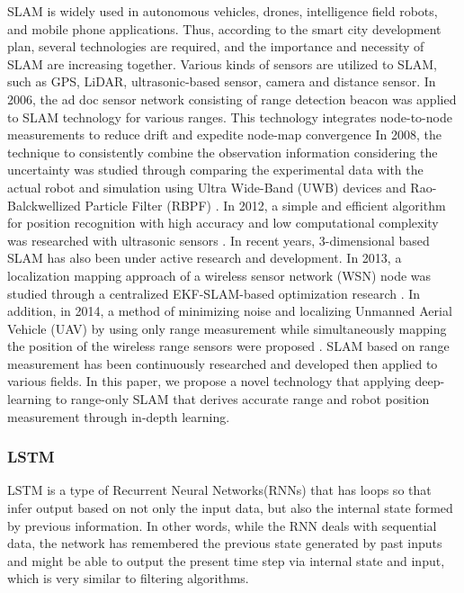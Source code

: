 \documentclass[letterpaper, 10 pt, conference]{ieeeconf}  %
\begin{document}
SLAM is widely used in autonomous vehicles, drones, intelligence field robots, and mobile phone applications. Thus, according to the smart city development plan, several technologies are required, and the importance and necessity of SLAM are increasing together. Various kinds of sensors are utilized to SLAM, such as GPS, LiDAR, ultrasonic-based sensor, camera and distance sensor.
In 2006, the ad doc sensor network consisting of range detection beacon was applied to SLAM technology for various ranges. This technology integrates node-to-node measurements to reduce drift and expedite node-map convergence \cite{djugash2006range} In 2008, the technique to consistently combine the observation information considering the uncertainty was studied through comparing the experimental data with the actual robot and simulation using Ultra Wide-Band (UWB) devices and Rao-Balckwellized Particle Filter (RBPF) \cite{blanco2008pure}.  In 2012, a simple and efficient algorithm for position recognition with high accuracy and low computational complexity was researched with ultrasonic sensors \cite{yang2012efficient}. In recent years, 3-dimensional based SLAM has also been under active research and development. In 2013, a localization mapping approach of a wireless sensor network (WSN) node was studied through a centralized EKF-SLAM-based optimization research \cite{fabresse2013undelayed}. In addition, in 2014, a method of minimizing noise and localizing Unmanned Aerial Vehicle (UAV) by using only range measurement while simultaneously mapping the position of the wireless range sensors were proposed \cite{fabresse2014robust}. 
SLAM based on range measurement has been continuously researched and developed then applied to various fields. In this paper, we propose a novel technology that applying deep-learning to range-only SLAM that derives accurate range and robot position measurement through in-depth learning. 


\subsubsection{LSTM}

LSTM is a type of Recurrent Neural Networks(RNNs) that has loops so that infer output based on not only the input data, but also the internal state formed by previous information. In other words, while the RNN deals with sequential data, the network has remembered the previous state generated by past inputs and might be able to output the present time step via internal state and input, which is very similar to filtering algorithms.
\end{document}
